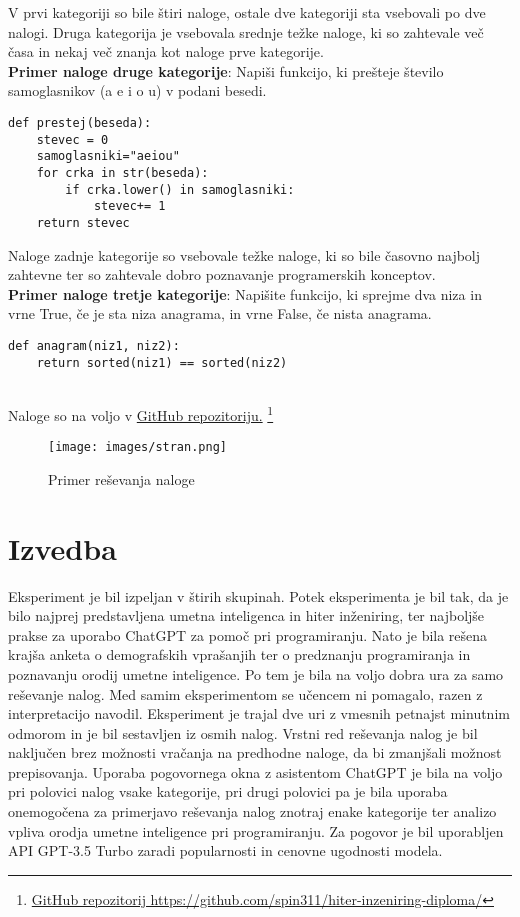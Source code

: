\documentclass[a4paper,12pt,openright]{book}
\begin{document}
V prvi kategoriji so bile štiri naloge, ostale dve kategoriji sta vsebovali po dve nalogi. Druga kategorija je vsebovala srednje težke naloge, ki so zahtevale več časa  in nekaj več znanja kot naloge prve kategorije. 
\\
\textbf{Primer naloge druge kategorije}:
Napiši funkcijo, ki prešteje število samoglasnikov (a e i o u) v podani besedi.
\begin{lstlisting}[style=python]
def prestej(beseda):
    stevec = 0
    samoglasniki="aeiou"
    for crka in str(beseda):
        if crka.lower() in samoglasniki:
            stevec+= 1
    return stevec
\end{lstlisting}
Naloge zadnje kategorije so vsebovale težke naloge, ki so bile časovno najbolj zahtevne ter so zahtevale dobro poznavanje programerskih konceptov.
\\
\textbf{Primer naloge tretje kategorije}:
Napišite funkcijo, ki sprejme dva niza in vrne True, če je sta niza anagrama, in vrne False, če nista anagrama.
\begin{lstlisting}[style=python]
def anagram(niz1, niz2):
    return sorted(niz1) == sorted(niz2)
    
\end{lstlisting}
Naloge so na voljo v  \href{https://github.com/spin311/hiter-inzeniring-diploma/tree/main/naloge}{GitHub repozitoriju.}
\footnote{\href{https://github.com/spin311/hiter-inzeniring-diploma/}{GitHub repozitorij https://github.com/spin311/hiter-inzeniring-diploma/}}


\begin{figure}[H]
    \centering
    \texttt{[image: images/stran.png]}
    \caption{Primer reševanja naloge}
    \label{fig:stran}
\end{figure}

\section{Izvedba}




Eksperiment je bil izpeljan v štirih skupinah. Potek eksperimenta je bil tak, da je bilo najprej predstavljena umetna inteligenca in hiter inženiring, ter najboljše prakse za uporabo ChatGPT za pomoč pri programiranju. Nato je bila rešena krajša anketa o demografskih vprašanjih ter o predznanju programiranja in poznavanju orodij umetne inteligence. Po tem je bila na voljo dobra ura za samo reševanje nalog. Med samim eksperimentom se učencem ni pomagalo, razen z interpretacijo navodil.
Eksperiment je trajal dve uri z vmesnih petnajst minutnim odmorom in je bil sestavljen iz osmih nalog. Vrstni red reševanja nalog je bil naključen brez možnosti vračanja na predhodne naloge, da bi zmanjšali možnost prepisovanja. Uporaba pogovornega okna z asistentom ChatGPT je bila na voljo pri polovici nalog vsake kategorije, pri drugi polovici pa je bila uporaba onemogočena za primerjavo reševanja nalog znotraj enake kategorije ter analizo vpliva orodja umetne inteligence pri programiranju. Za pogovor je bil uporabljen API GPT-3.5 Turbo zaradi popularnosti in cenovne ugodnosti modela.
\end{document}
